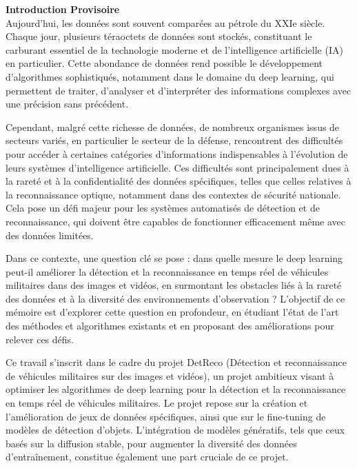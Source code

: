 \sloppy

\textbf{Introduction Provisoire}\\

Aujourd’hui, les données sont souvent comparées au pétrole du XXIe siècle.
Chaque jour, plusieurs téraoctets de données sont stockés, constituant le carburant essentiel de la technologie moderne et de l'intelligence artificielle (IA) en particulier.
Cette abondance de données rend possible le développement d'algorithmes sophistiqués, notamment dans le domaine du deep learning, qui permettent de traiter, d'analyser et d'interpréter des informations complexes avec une précision sans précédent.

Cependant, malgré cette richesse de données, de nombreux organismes issus de secteurs variés, en particulier le secteur de la défense, rencontrent des difficultés pour accéder à certaines catégories d’informations indispensables à l'évolution de leurs systèmes d'intelligence artificielle.
Ces difficultés sont principalement dues à la rareté et à la confidentialité des données spécifiques, telles que celles relatives à la reconnaissance optique, notamment dans des contextes de sécurité nationale. Cela pose un défi majeur pour les systèmes automatisés de détection et de reconnaissance, qui doivent être capables de fonctionner efficacement même avec des données limitées.

Dans ce contexte, une question clé se pose : dans quelle mesure le deep learning peut-il améliorer la détection et la reconnaissance en temps réel de véhicules militaires dans des images et vidéos, en surmontant les obstacles liés à la rareté des données et à la diversité des environnements d'observation ?
L’objectif de ce mémoire est d'explorer cette question en profondeur, en étudiant l’état de l’art des méthodes et algorithmes existants et en proposant des améliorations pour relever ces défis.

Ce travail s’inscrit dans le cadre du projet DetReco (Détection et reconnaissance de véhicules militaires sur des images et vidéos), un projet ambitieux visant à optimiser les algorithmes de deep learning pour la détection et la reconnaissance en temps réel de véhicules militaires.
Le projet repose sur la création et l’amélioration de jeux de données spécifiques, ainsi que sur le fine-tuning de modèles de détection d’objets.
L'intégration de modèles génératifs, tels que ceux basés sur la diffusion stable, pour augmenter la diversité des données d'entraînement, constitue également une part cruciale de ce projet.

